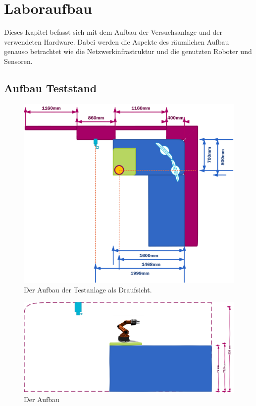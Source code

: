 \section{Laboraufbau}
\label{sec:basic-aufbau}
    
Dieses Kapitel befasst sich mit dem Aufbau der Versuchsanlage und der verwendeten Hardware. Dabei werden die Aspekte des räumlichen Aufbau genauso betrachtet wie die Netzwerkinfrastruktur und die genutzten Roboter und Sensoren.



\subsection{Aufbau Teststand}

 \begin{figure}[h]
 	\centering
 	\includegraphics[scale=0.8]{fig/ZeichnungRaum}   
 	\caption[Aufbau Teststand: Draufsicht]{Der Aufbau der Testanlage als Draufsicht.}
 	\label{fig:basic-aufbau-teststand}
 \end{figure}
 
 
  \begin{figure}[h]
  	\centering
  	\includegraphics[scale=0.5]{fig/ZeichnungRaumH}   
  	\caption[Aufbau Teststand: Seitenansicht]{Der Aufbau}
  	\label{fig:basic-aufbau-teststandh}
  \end{figure}

